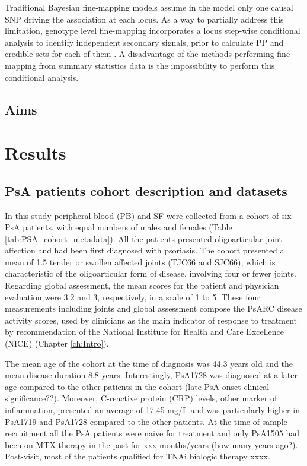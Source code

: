 Traditional Bayesian fine-mapping models assume in the model only one causal SNP driving the association at each locus. As a way to partially address this limitation, genotype level fine-mapping incorporates a locus step-wise conditional analysis to identify independent secondary signals, prior to calculate PP and credible sets for each of them . A disadvantage of the methods performing fine-mapping from summary statistics data is the impossibility to perform this conditional analysis.

\subsection{Aims}



\section{Results}
%

\subsection{PsA patients cohort description and datasets}
In this study peripheral blood (PB) and SF were collected from a cohort of six PsA patients, with equal numbers of males and females (Table \ref{tab:PSA_cohort_metadata}). All the patients presented oligoarticular joint affection and had been first diagnosed with psoriasis. The cohort presented a mean of 1.5 tender or swollen affected joints (TJC66 and SJC66), which is characteristic of the oligoarticular form of disease, involving four or fewer joints. Regarding global assessment, the mean scores for the patient and physician evaluation were 3.2 and 3, respectively, in a scale of 1 to 5. These four measurements including joints and global assessment compose the PsARC disease activity scores, used by clinicians as the main indicator of response to treatment by recommendation of the National Institute for Health and Care Excellence (NICE) (Chapter \ref{ch:Intro}). 

The mean age of the cohort at the time of diagnosis was 44.3 years old and the mean disease duration 8.8 years. Interestingly, PsA1728 was diagnosed at a later age compared to the other patients in the cohort (late PsA onset clinical significance??). Moreover, C-reactive protein (CRP) levels, other marker of inflammation, presented an average of 17.45 mg/L and was particularly higher in PsA1719 and PsA1728 compared to the other patients. At the time of sample recruitment all the PsA patients were na\"{i}ve for treatment and only PsA1505 had been on MTX therapy in the past for xxx months/years (how many years ago?). Post-visit, most of the patients qualified for TNAi biologic therapy xxxx.


